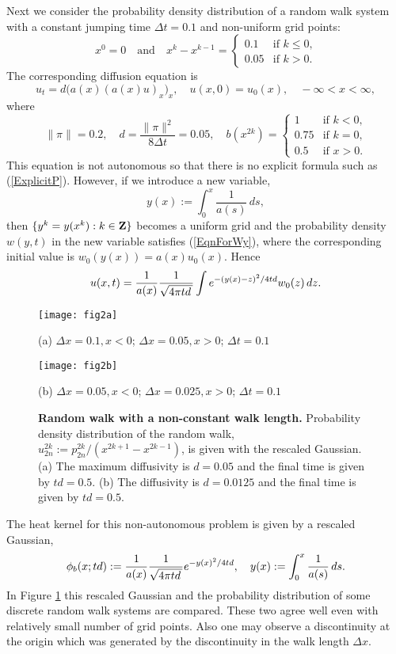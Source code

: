 \documentclass[11pt]{amsart}
\def\d{d}
\def\Z{{\bf Z}}
\begin{document}
Next we consider the probability density distribution of a random walk system with a constant jumping time $\Delta t=0.1$ and non-uniform grid points:
\[
x^0=0\quad\text{and}\quad x^k-x^{k-1}=
\begin{cases}
0.1 & \text{if $k\leq 0$,}\\
0.05 & \text{if $k>0$.}
\end{cases}\]
The corresponding diffusion equation is
\begin{equation*}\label{EqnForU2}
u_t=\d \big(a(x)(a(x)u)_x \big)_x,\quad u(x,0)=u_0(x),\quad -\infty<x<\infty,
\end{equation*}
where
$$
\|\pi\|=0.2, \quad \d=\frac{\|\pi\|^2}{8\Delta t}=0.05, \quad b(x^{2k})=
\begin{cases}
1 & \text{if $k<0$,}\\
0.75 & \text{if $k=0$,}\\
0.5 & \text{if $x>0$.}
\end{cases}
$$
This equation is not autonomous so that there is no explicit formula such as (\ref{ExplicitP}). However, if we introduce a new variable,
\[y(x) := \int_0^{x}\frac{1}{a(s)}\,ds,\]
then $\{y^k=y(x^k):k\in\Z\}$ becomes a uniform grid and the probability density $w(y,t)$ in the new variable satisfies (\ref{EqnForWy}), where the corresponding initial value is $w_0(y(x))=a(x)u_0(x)$. Hence
\begin{equation*}\label{000}
u(x,t)={1\over a(x)} \frac{1}{\sqrt{4\pi t\d\,}} \int e^{-(y(x)-z)^2/4t\d} w_0(z)\,dz.
\end{equation*}

\begin{figure}[ht]
\centering
\begin{minipage}[t]{0.48\textwidth}
\centering
\texttt{[image: fig2a]}

(a) $\Delta x=0.1, x<0$; $\Delta x=0.05, x>0$; $\Delta t=0.1$
\end{minipage}
\begin{minipage}[t]{0.48\textwidth}
 \centering
 \texttt{[image: fig2b]}

(b) $\Delta x=0.05, x<0$; $\Delta x=0.025, x>0$; $\Delta t=0.1$
\end{minipage}
\caption{{\bf Random walk with a non-constant walk length.} Probability density distribution of the random walk, $u^{2k}_{2n}:=p^{2k}_{2n}/(x^{2k+1}-x^{2k-1})$, is given with the rescaled Gaussian. (a) The maximum diffusivity is $\d=0.05$ and the final time is given by $t\d=0.5$.  (b) The diffusivity is $\d=0.0125$ and the final time is given by $t\d=0.5$. } \label{fig2}
\end{figure}
The heat kernel for this non-autonomous problem is given by a rescaled Gaussian,
\begin{equation*}
\phi_b(x;t\d) := {1\over a(x)}\frac{1}{\sqrt{4\pi t\d\,}}e^{-y(x)^2/4t\d},\quad y(x) := \int_0^{x}\frac{1}{a(s)}\,ds.
\end{equation*}
In Figure \ref{fig2} this rescaled Gaussian and the probability distribution of some discrete random walk systems are compared. These two agree well even with relatively small number of grid points. Also one may observe a discontinuity at the origin which was generated by the discontinuity in the walk length $\Delta x$.
\end{document}
